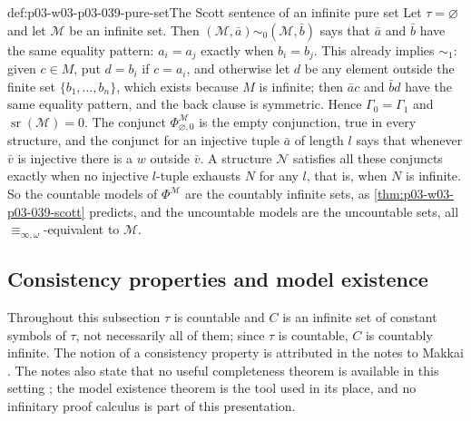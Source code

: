 \begin{hbexample}{def:p03-w03-p03-039-pure-set}{The Scott sentence of an infinite pure set}
Let \(\tau=\varnothing\) and let \(\mathcal M\) be an infinite set. Then
\((\mathcal M,\bar a)\sim_0(\mathcal M,\bar b)\) says that \(\bar a\) and
\(\bar b\) have the same equality pattern: \(a_i=a_j\) exactly when
\(b_i=b_j\). This already implies \(\sim_1\): given \(c\in M\), put
\(d=b_i\) if \(c=a_i\), and otherwise let \(d\) be any element outside the
finite set \(\{b_1,\ldots,b_n\}\), which exists because \(M\) is infinite;
then \(\bar ac\) and \(\bar bd\) have the same equality pattern, and the
back clause is symmetric. Hence \(\Gamma_0=\Gamma_1\) and
\(\operatorname{sr}(\mathcal M)=0\). The conjunct
\(\Phi^{\mathcal M}_{\varnothing,0}\) is the empty conjunction, true in every
structure, and the conjunct for an injective tuple \(\bar a\) of length
\(l\) says that whenever \(\bar v\) is injective there is a \(w\) outside
\(\bar v\). A structure \(\mathcal N\) satisfies all these conjuncts exactly
when no injective \(l\)-tuple exhausts \(N\) for any \(l\), that is, when
\(N\) is infinite. So the countable models of \(\Phi^{\mathcal M}\) are the
countably infinite sets, as \cref{thm:p03-w03-p03-039-scott} predicts, and
the uncountable models are the uncountable sets, all
\(\equiv_{\infty,\omega}\)-equivalent to \(\mathcal M\).
\end{hbexample}

\subsection{Consistency properties and model existence}
\label{sec:p03-w03-p03-039-model-existence}

Throughout this subsection \(\tau\) is countable and \(C\) is an infinite
set of constant symbols of \(\tau\), not necessarily all of them; since
\(\tau\) is countable, \(C\) is countably infinite. The notion of a
consistency property is attributed in the notes to Makkai
\cite[p.~39]{Marker2014InfinitaryNotes}. The notes also state that no useful
completeness theorem is available in this setting
\cite[p.~39]{Marker2014InfinitaryNotes}; the model existence theorem is the
tool used in its place, and no infinitary proof calculus is part of this
presentation.

